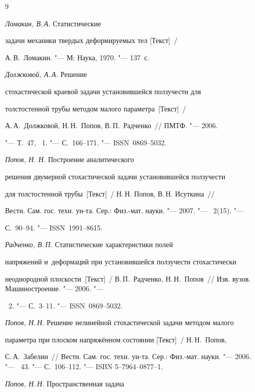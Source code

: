 \begin{thebibliography}{9}

 \textit{Ломакин, В.\,А.} Статистические

  задачи механики твердых деформируемых тел [Текст]~/

  А.\,В.~Ломакин.  "--- М: Наука, 1970.  "--- 137~с.



 \textit{Должковой, А.\,А.} Решение

  стохастической краевой задачи установившейся ползучести для

  толстостенной трубы методом малого параметра~[Текст]~/

  А.\,А.~Должковой, Н.\,Н.~Попов, В.\,П.~Радченко~/\!/ ПМТФ.  "--- 2006.

  "--- Т.~47, \No~1. "--- С.~166--171. "--- ISSN~0869--5032.



 \emph{Попов, Н. Н.} Построение аналитического

  решения двумерной стохастической задачи установившейся ползучести

  для толстостенной трубы~[Текст]~/ Н.\,Н. Попов, В.\,Н. Исуткина~/\!/ 

  Вестн. Сам. гос. техн. ун-та. Сер.: Физ.-мат. науки. "--- 2007.  "--- \No~2(15). "---

  С.~90--94. "--- ISSN~1991--8615.



 \textit{Радченко, В.\,П.} Статистические характеристики полей

  напряжений и~деформаций при установившейся ползучести стохастически

  неоднородной плоскости~[Текст]~/ В.\,П.~Радченко, Н.\,Н.~Попов~/\!/ Изв. вузов. Машиностроение. "--- 2006. "---

  \No~2. "--- С.~3--11. "--- ISSN~0869--5032.



 \textit{Попов, Н.\,Н.} Решение нелинейной стохастической задачи методом малого

  параметра при плоском напряжённом состоянии [Текст]~/ Н.\,Н.~Попов,

  С.\,А.~Забелин~/\!/ Вестн. Сам. гос. техн. ун-та.  Сер.: Физ.-мат. науки. "--- 2006. "--- \No~43. "--- С.~106--112. "--- ISBN 5--7964--0877--1.



 \textit{Попов, Н.\,Н.} Пространственная задача


\end{thebibliography}
